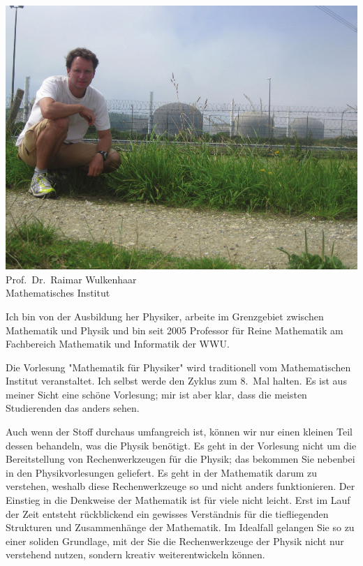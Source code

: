 \begin{multicols}{2}
\begin{center}
\includegraphics[width=0.9\columnwidth]{res/vorstellungsfotos/wulkenhaar.png}\\
Prof.\ Dr.\ Raimar Wulkenhaar\\
Mathematisches Institut
\end{center}

Ich bin von der Ausbildung her Physiker, arbeite im Grenzgebiet zwischen Mathematik und Physik und bin seit 2005 Professor für Reine Mathematik am Fachbereich Mathematik und Informatik der WWU.

Die Vorlesung "Mathematik für Physiker" wird traditionell vom Mathematischen Institut veranstaltet. Ich selbst werde den Zyklus zum 8.~Mal halten. Es ist aus meiner Sicht eine schöne Vorlesung; mir ist aber klar, dass die meisten Studierenden das anders sehen.

Auch wenn der Stoff durchaus umfangreich ist, können wir nur einen kleinen Teil dessen behandeln, was die Physik benötigt. Es geht in der Vorlesung nicht um die Bereitstellung von Rechenwerkzeugen für die Physik; das bekommen Sie nebenbei in den Physikvorlesungen geliefert. Es geht in der Mathematik darum zu verstehen, weshalb diese Rechenwerkzeuge so und nicht anders funktionieren. Der Einstieg in die Denkweise der Mathematik ist für viele nicht leicht. Erst im Lauf der Zeit entsteht rückblickend ein gewisses Verständnis für die tiefliegenden Strukturen und Zusammenhänge der Mathematik. Im Idealfall gelangen Sie so zu einer soliden Grundlage, mit der Sie die Rechenwerkzeuge der Physik nicht nur verstehend nutzen, sondern kreativ weiterentwickeln können.



\end{multicols}
